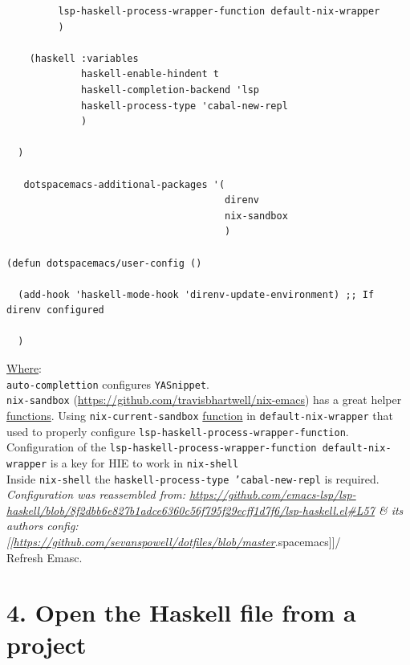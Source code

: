 \documentclass[a4paper,14pt,oneside]{book}
\begin{document}
{\begin{verbatim}
         lsp-haskell-process-wrapper-function default-nix-wrapper
         )

    (haskell :variables
             haskell-enable-hindent t
             haskell-completion-backend 'lsp
             haskell-process-type 'cabal-new-repl
             )

  )

   dotspacemacs-additional-packages '(
                                      direnv
                                      nix-sandbox
                                      )

(defun dotspacemacs/user-config ()

  (add-hook 'haskell-mode-hook 'direnv-update-environment) ;; If direnv configured

  )
\end{verbatim}

\hyperref[org5b6b021]{Where}:\\

\texttt{auto-complettion} configures \texttt{YASnippet}.\\

\texttt{nix-sandbox} (\url{https://github.com/travisbhartwell/nix-emacs}) has a great helper \hyperref[orgf33f5fb]{functions}. Using \texttt{nix-current-sandbox} \hyperref[org6a60524]{function} in \texttt{default-nix-wrapper} that used to properly configure \texttt{lsp-haskell-process-wrapper-function}.\\

Configuration of the \texttt{lsp-haskell-process-wrapper-function default-nix-wrapper} is a key for HIE to work in \texttt{nix-shell}\\

Inside \texttt{nix-shell} the \texttt{haskell-process-type 'cabal-new-repl} is required.\\

\emph{Configuration was reassembled from: \url{https://github.com/emacs-lsp/lsp-haskell/blob/8f2dbb6e827b1adce6360c56f795f29ecff1d7f6/lsp-haskell.el\#L57} \& its authors config: [[\url{https://github.com/sevanspowell/dotfiles/blob/master}}.spacemacs]]/\\

Refresh Emasc.\\

\section{4. Open the Haskell file from a project}
\label{sec:org543bd26}

}
\end{document}
